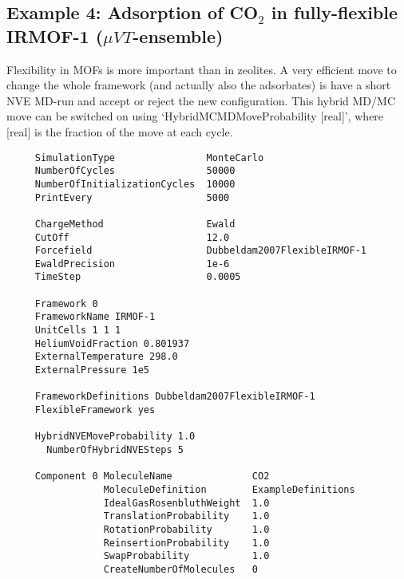\subsection*{Example 4: Adsorption of CO$_2$ in fully-flexible IRMOF-1 ($\mu VT$-ensemble)}

Flexibility in MOFs is more important than in zeolites. A very efficient move to change the whole framework (and actually
also the adsorbates) is have a short NVE MD-run and accept or reject the new configuration. This hybrid MD/MC move can be switched on using
`HybridMCMDMoveProbability  [real]', where [real] is the fraction of the move at each cycle.

\begin{tiny}
\begin{verbatim}
     SimulationType                MonteCarlo
     NumberOfCycles                50000
     NumberOfInitializationCycles  10000
     PrintEvery                    5000

     ChargeMethod                  Ewald
     CutOff                        12.0
     Forcefield                    Dubbeldam2007FlexibleIRMOF-1
     EwaldPrecision                1e-6
     TimeStep                      0.0005

     Framework 0
     FrameworkName IRMOF-1
     UnitCells 1 1 1
     HeliumVoidFraction 0.801937
     ExternalTemperature 298.0
     ExternalPressure 1e5

     FrameworkDefinitions Dubbeldam2007FlexibleIRMOF-1
     FlexibleFramework yes

     HybridNVEMoveProbability 1.0
       NumberOfHybridNVESteps 5

     Component 0 MoleculeName              CO2
                 MoleculeDefinition        ExampleDefinitions
                 IdealGasRosenbluthWeight  1.0
                 TranslationProbability    1.0
                 RotationProbability       1.0
                 ReinsertionProbability    1.0
                 SwapProbability           1.0
                 CreateNumberOfMolecules   0
\end{verbatim}
\end{tiny}


